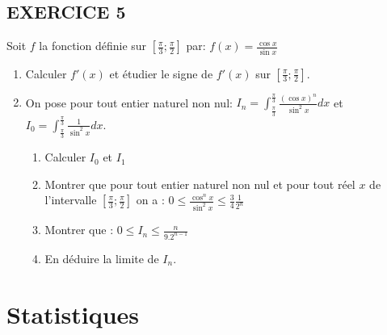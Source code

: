 \documentclass[13pts]{report}
\begin{document}
\section*{EXERCICE 5}
Soit $f$ la fonction définie sur $[\frac{\pi}{3}; \frac{\pi}{2}]$ par: $f(x)=\frac{\cos x}{\sin x}$
\begin{enumerate}
	\item Calculer $f'(x)$ et étudier le signe de $f'(x)$ sur  $[\frac{\pi}{3}; \frac{\pi}{2}]$.
	\item On pose pour tout entier naturel non nul: $I_n= \int_{\frac{\pi}{3}}^{\frac{\pi}{3}}\frac{(\cos x)^n}{\sin ^2x}dx$ et  $I_0= \int_{\frac{\pi}{3}}^{\frac{\pi}{3}}\frac{1}{\sin ^2x}dx$.
	\begin{enumerate}
		\item Calculer $I_0$ et $I_1$
		\item Montrer que pour tout entier naturel non nul et pour tout réel $x$ de l'intervalle $[\frac{\pi}{3}; \frac{\pi}{2}]$ on a : $0 \leq \frac{\cos^nx}{\sin^2x}\leq \frac{3}{4}\frac{1}{2^n}$
		\item Montrer que : $0 \leq I_n \leq \frac{n}{9.2^{n-1}}$
		\item En déduire la limite de $I_n$.
	\end{enumerate}
\end{enumerate}







\chapter{Statistiques}
\end{document}

